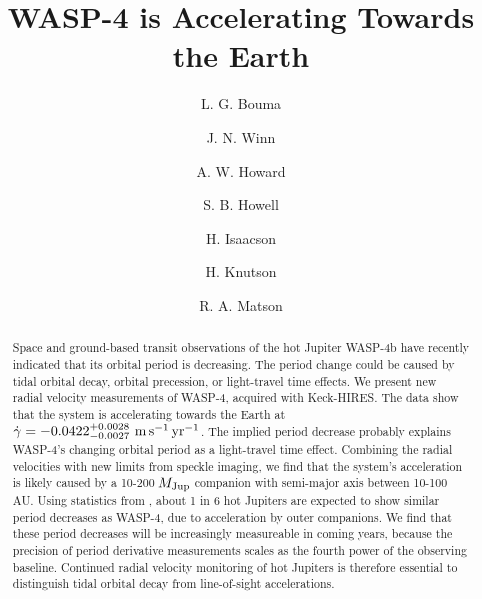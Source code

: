 \documentclass[12pt,twocolumn,tighten]{aastex62}
\begin{document}

\title{WASP-4 is Accelerating Towards the Earth}


%
%
\author[0000-0002-0514-5538]{L. G. Bouma}
%
\author[0000-0002-4265-047X]{J. N. Winn}

%
%
\author[0000-0001-8638-0320]{A. W. Howard}
%
\author{S. B. Howell}
%
\author[0000-0002-0531-1073]{H. Isaacson}
%
\author{H. Knutson}
%
\author{R. A. Matson}
%

\begin{abstract}
  Space and ground-based transit observations of the hot Jupiter
  WASP-4b have recently indicated that its orbital period is
  decreasing.  The period change could be caused by tidal orbital
  decay, orbital precession, or light-travel time effects.  We present
  new radial velocity measurements of WASP-4, acquired with
  Keck-HIRES.  The data show that the system is accelerating towards
  the Earth at $\dot{\gamma} = -0.0422^{+0.0028}_{-0.0027}\ {\rm
  m}\,{\rm s}^{-1}\,{\rm yr}^{-1}$.  The implied period decrease
  probably explains WASP-4's changing orbital period as a light-travel
  time effect.  Combining the radial velocities with new limits from
  speckle imaging, we find that the system's acceleration is likely
  caused by a 10-200$\,M_{\rm Jup}$ companion with semi-major axis
  between 10-100$\,$AU.  Using statistics from
  \citet{knutson_friends_2014}, about 1 in 6 hot Jupiters are expected
  to show similar period decreases as WASP-4, due to acceleration by
  outer companions.  We find that these period decreases will be
  increasingly measureable in coming years, because the precision of
  period derivative measurements scales as the fourth power of the
  observing baseline.  Continued radial velocity monitoring
  of hot Jupiters is therefore essential to distinguish tidal orbital
  decay from line-of-sight accelerations.
\end{abstract}
\end{document}
